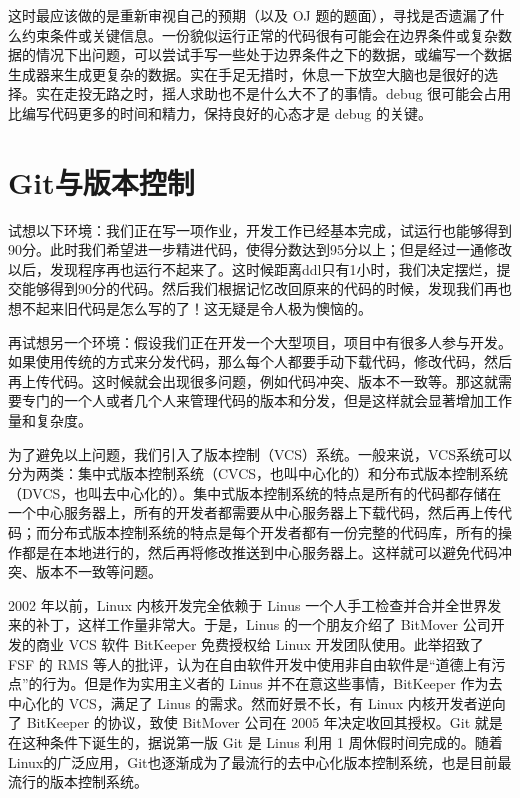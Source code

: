 这时最应该做的是重新审视自己的预期（以及 OJ 题的题面），寻找是否遗漏了什么约束条件或关键信息。一份貌似运行正常的代码很有可能会在边界条件或复杂数据的情况下出问题，可以尝试手写一些处于边界条件之下的数据，或编写一个数据生成器来生成更复杂的数据。实在手足无措时，休息一下放空大脑也是很好的选择。实在走投无路之时，摇人求助也不是什么大不了的事情。debug 很可能会占用比编写代码更多的时间和精力，保持良好的心态才是 debug 的关键。

\section{Git与版本控制}

试想以下环境：我们正在写一项作业，开发工作已经基本完成，试运行也能够得到90分。此时我们希望进一步精进代码，使得分数达到95分以上；但是经过一通修改以后，发现程序再也运行不起来了。这时候距离ddl只有1小时，我们决定摆烂，提交能够得到90分的代码。然后我们根据记忆改回原来的代码的时候，发现我们再也想不起来旧代码是怎么写的了！这无疑是令人极为懊恼的。

再试想另一个环境：假设我们正在开发一个大型项目，项目中有很多人参与开发。如果使用传统的方式来分发代码，那么每个人都要手动下载代码，修改代码，然后再上传代码。这时候就会出现很多问题，例如代码冲突、版本不一致等。那这就需要专门的一个人或者几个人来管理代码的版本和分发，但是这样就会显著增加工作量和复杂度。

为了避免以上问题，我们引入了版本控制（VCS）系统。一般来说，VCS系统可以分为两类：集中式版本控制系统（CVCS，也叫中心化的）和分布式版本控制系统（DVCS，也叫去中心化的）。集中式版本控制系统的特点是所有的代码都存储在一个中心服务器上，所有的开发者都需要从中心服务器上下载代码，然后再上传代码；而分布式版本控制系统的特点是每个开发者都有一份完整的代码库，所有的操作都是在本地进行的，然后再将修改推送到中心服务器上。这样就可以避免代码冲突、版本不一致等问题。

2002 年以前，Linux 内核开发完全依赖于 Linus 一个人手工检查并合并全世界发来的补丁，这样工作量非常大。于是，Linus 的一个朋友介绍了 BitMover 公司开发的商业 VCS 软件 BitKeeper 免费授权给 Linux 开发团队使用。此举招致了 FSF 的 RMS 等人的批评，认为在自由软件开发中使用非自由软件是“道德上有污点”的行为。但是作为实用主义者的 Linus 并不在意这些事情，BitKeeper 作为去中心化的 VCS，满足了 Linus 的需求。然而好景不长，有 Linux 内核开发者逆向了 BitKeeper 的协议，致使 BitMover 公司在 2005 年决定收回其授权。Git 就是在这种条件下诞生的，据说第一版 Git 是 Linus 利用 1 周休假时间完成的。随着Linux的广泛应用，Git也逐渐成为了最流行的去中心化版本控制系统，也是目前最流行的版本控制系统。

